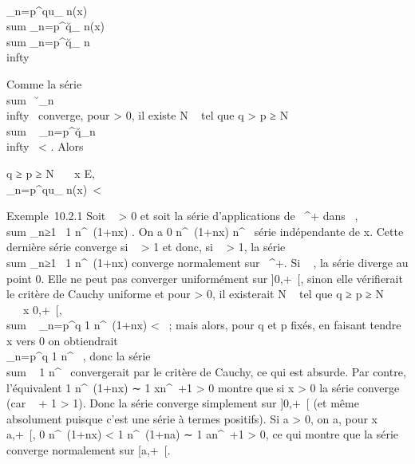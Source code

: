\documentclass[]{article}
\begin{document}
\\\sum
_n=p^qu_ n(x)\
\leq\\sum
_n=p^q\u_
n(x)\ \leq\\sum
_n=p^q\u_
n\\infty~

Comme la série \\sum ~
\u_n\\infty~
converge, pour \epsilon \textgreater{} 0, il existe N \in {}~ tel que q
\textgreater{} p ≥ N
\rigtharrow~\\sum ~
_n=p^q\u_n\\infty~
\textless{} \epsilon. Alors

q ≥ p ≥ N \rigtharrow~\forall~~x \in E,
\\\sum
_n=p^qu_ n(x)\
\textless{} \epsilon

Exemple~10.2.1 Soit \alpha~ \textgreater{} 0 et soit la série d'applications
de ~^+ dans ~,
\\sum  _n≥1~ 1
\over n^\alpha~(1+nx) . On a 0 
\over n^\alpha~(1+nx)  \over
n^\alpha~ série indépendante de x. Cette dernière série converge
si \alpha~ \textgreater{} 1 et donc, si \alpha~ \textgreater{} 1, la série
\\sum  _n≥1~ 1
\over n^\alpha~(1+nx) converge normalement sur
~^+. Si \alpha~ , la série diverge au point 0. Elle ne peut pas
converger uniformément sur {]}0,+\infty~{[}, sinon elle vérifierait le critère
de Cauchy uniforme et pour \epsilon \textgreater{} 0, il existerait N \in {}~ tel
que q ≥ p ≥ N \rigtharrow~\forall~~x \in{]}0,+\infty~{[},
\\sum ~
_n=p^q 1 \over n^\alpha~(1+nx)
\textless{} \epsilon~; mais alors, pour q et p fixés, en faisant tendre x vers
0 on obtiendrait \\\sum
 _n=p^q 1 \over n^\alpha~ \leq \epsilon,
donc la série \\sum ~ 
1 \over n^\alpha~ convergerait par le critère de
Cauchy, ce qui est absurde. Par contre, l'équivalent  1
\over n^\alpha~(1+nx) ∼ 1 \over
xn^\alpha~+1 \textgreater{} 0 montre que si x \textgreater{} 0 la
série converge (car \alpha~ + 1 \textgreater{} 1). Donc la série converge
simplement sur {]}0,+\infty~{[} (et même absolument puisque c'est une série à
termes positifs). Si a \textgreater{} 0, on a, pour x \in {[}a,+\infty~{[}, 0
\leq 1 \over n^\alpha~(1+nx) \textless{} 1
\over n^\alpha~(1+na) ∼ 1 \over
an^\alpha~+1 \textgreater{} 0, ce qui montre que la série
converge normalement sur {[}a,+\infty~{[}.
\end{document}
